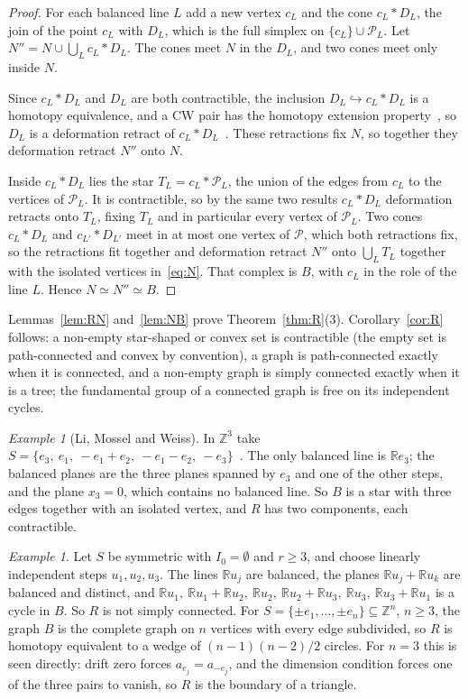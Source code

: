 \documentclass[11pt]{amsart}
\theoremstyle{remark}
\newtheorem{example}[theorem]{Example}
\newcommand{\R}{\mathbb{R}}
\newcommand{\Z}{\mathbb{Z}}
\begin{document}
\begin{proof}
For each balanced line $L$ add a new vertex $c_L$ and the cone $c_L*D_L$, the join of the point $c_L$ with $D_L$,
which is the full simplex on $\{c_L\}\cup\mathcal P_L$. Let $N''=N\cup\bigcup_L c_L*D_L$. The cones meet $N$ in the $D_L$, and two cones meet only
inside $N$.

Since $c_L*D_L$ and $D_L$ are both contractible, the inclusion $D_L\hookrightarrow c_L*D_L$ is a homotopy equivalence,
and a CW pair has the homotopy extension property~\cite[Proposition~0.16]{Hat02}, so $D_L$ is a deformation retract
of $c_L*D_L$~\cite[Corollary~0.20]{Hat02}. These retractions fix $N$, so together they deformation retract $N''$ onto
$N$.

Inside $c_L*D_L$ lies the star $T_L=c_L*\mathcal P_L$, the union of the edges from $c_L$ to the vertices of
$\mathcal P_L$. It is contractible, so by the same two results $c_L*D_L$ deformation retracts onto $T_L$, fixing
$T_L$ and in particular every vertex of $\mathcal P_L$. Two cones $c_L*D_L$ and $c_{L'}*D_{L'}$ meet in at most one
vertex of $\mathcal P$, which both retractions fix, so the retractions fit together and deformation retract $N''$
onto $\bigcup_L T_L$ together with the isolated vertices in~\eqref{eq:N}. That complex is $B$, with $c_L$ in the
role of the line $L$. Hence $N\simeq N''\simeq B$.
\end{proof}

Lemmas~\ref{lem:RN} and~\ref{lem:NB} prove Theorem~\ref{thm:R}(3). Corollary~\ref{cor:R} follows: a non-empty star-shaped
or convex set is contractible (the empty set is path-connected and convex by convention), a graph is path-connected exactly when it is connected, and a non-empty graph is simply
connected exactly when it is a tree; the fundamental group of a connected graph is free on its independent cycles.

\begin{example}[Li, Mossel and Weiss]\label{ex:64}
In $\Z^3$ take $S=\{e_3,\ e_1,\ -e_1+e_2,\ -e_1-e_2,\ -e_3\}$~\cite[Example~6.4]{LMW}. The only balanced line is
$\R e_3$; the balanced planes are the three planes spanned by $e_3$ and one of the other steps, and the plane
$x_3=0$, which contains no balanced line. So $B$ is a star with three edges together with an isolated vertex, and $R$
has two components, each contractible.
\end{example}

\begin{example}\label{ex:sym}
Let $S$ be symmetric with $I_0=\emptyset$ and $r\ge3$, and choose linearly independent steps $u_1,u_2,u_3$. The lines
$\R u_j$ are balanced, the planes $\R u_j+\R u_k$ are balanced and distinct, and
$\R u_1,\ \R u_1+\R u_2,\ \R u_2,\ \R u_2+\R u_3,\ \R u_3,\ \R u_3+\R u_1$ is a cycle in $B$. So $R$ is not simply
connected. For $S=\{\pm e_1,\dots,\pm e_n\}\subseteq\Z^n$, $n\ge3$, the graph $B$ is the complete graph on $n$ vertices
with every edge subdivided, so $R$ is homotopy equivalent to a wedge of $(n-1)(n-2)/2$ circles. For $n=3$ this is seen
directly: drift zero forces $a_{e_j}=a_{-e_j}$, and the dimension condition forces one of the three pairs to vanish,
so $R$ is the boundary of a triangle.
\end{example}
\end{document}
